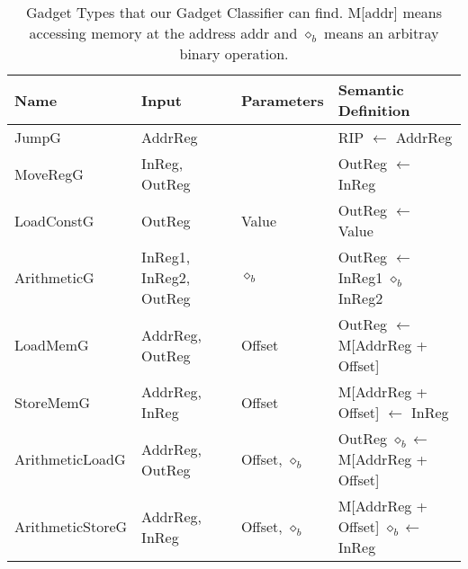 \documentclass[journal]{IEEEtran}
\begin{document}
\begin{table*}[t,s]
  \begin{center}
    \begin{tabular}{ | l | l | l | l | }
    \hline
    Name & Input & Parameters & Semantic Definition \\
    \hline
    JumpG & AddrReg & & RIP $\leftarrow$ AddrReg \\
    MoveRegG & InReg, OutReg & & OutReg $\leftarrow$ InReg \\
    LoadConstG & OutReg & Value & OutReg $\leftarrow$ Value \\
    ArithmeticG & InReg1, InReg2, OutReg & $\diamond_b$ & OutReg $\leftarrow$ InReg1 $\diamond_b$ InReg2 \\
    LoadMemG & AddrReg, OutReg & Offset & OutReg $\leftarrow$ M[AddrReg + Offset] \\
    StoreMemG & AddrReg, InReg & Offset & M[AddrReg + Offset] $\leftarrow$ InReg \\
    ArithmeticLoadG & AddrReg, OutReg & Offset, $\diamond_b$ & OutReg $\diamond_b$$\leftarrow$  M[AddrReg + Offset] \\
    ArithmeticStoreG & AddrReg, InReg & Offset, $\diamond_b$ & M[AddrReg + Offset] $\diamond_b$$\leftarrow$ InReg \\
      \hline
    \end{tabular}
    \caption{Gadget Types that our Gadget Classifier can find.  M[addr] means accessing memory at the address addr and $\diamond_b$ means an arbitray binary operation.}
  \label{gadgetTypes}
  \end{center}
\end{table*}
\end{document}
